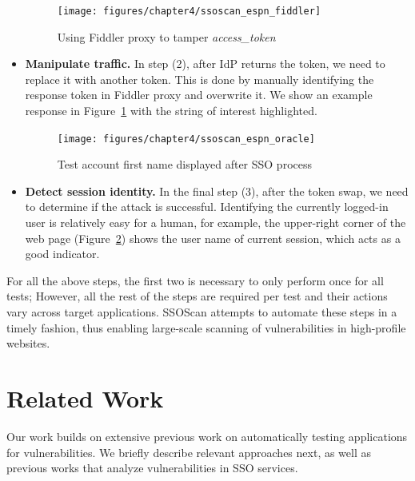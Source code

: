 \begin{itemize}
\begin{figure}[bht]
\centering
\texttt{[image: figures/chapter4/ssoscan\_espn\_fiddler]}
\caption{Using Fiddler proxy to tamper \emph{access\_token}}
\label{fig:ssoscan_espn_fiddler}
\end{figure}

\item \textbf{Manipulate traffic.} In step (2), after IdP returns the token, we need to replace it with another token.  This is done by manually identifying the response token in Fiddler proxy and overwrite it.  We show an example response in Figure~\ref{fig:ssoscan_espn_fiddler} with the string of interest highlighted.

\begin{figure}[hbt]
\centering
\texttt{[image: figures/chapter4/ssoscan\_espn\_oracle]}
\caption{Test account first name displayed after SSO process}
\label{fig:ssoscan_espn_oracle}
\end{figure}

\item \textbf{Detect session identity.}  In the final step (3), after the token swap, we need to determine if the attack is successful.  Identifying the currently logged-in user is relatively easy for a human, for example, the upper-right corner of the web page (Figure~\ref{fig:ssoscan_espn_oracle}) shows the user name of current session, which acts as a good indicator.

\end{itemize}

For all the above steps, the first two is necessary to only perform once for all tests;  However, all the rest of the steps are required per test and their actions vary across target applications.  SSOScan attempts to automate these steps in a timely fashion, thus enabling large-scale scanning of vulnerabilities in high-profile websites.  

\section{Related Work}
\label{sec:ssoscan_related_work}

Our work builds on extensive previous work on automatically testing applications for vulnerabilities.  We briefly describe relevant approaches next, as well as previous works that analyze vulnerabilities in SSO services.

